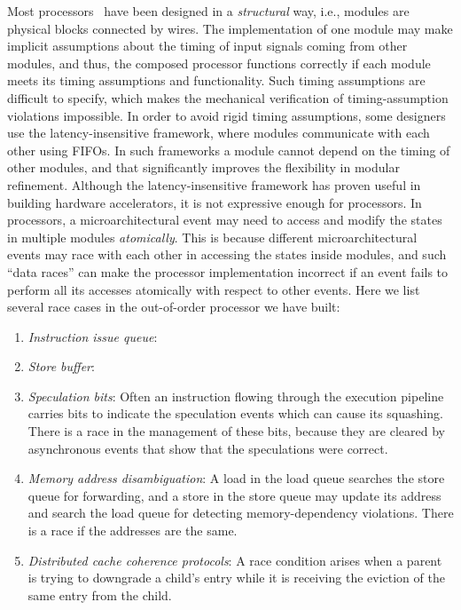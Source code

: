 \documentclass[conference]{IEEEtran}
\begin{document}
Most processors~\cite{rocketchip,boom,fabscalar,pulp} have been designed in a \emph{structural} way, i.e., modules are physical blocks connected by wires.
The implementation of one module may make implicit assumptions about the timing of input signals coming from other modules, and thus, the composed processor functions correctly if each module meets its timing assumptions and functionality.
Such timing assumptions are difficult to specify, which makes the mechanical verification of timing-assumption violations impossible.
In order to avoid rigid timing assumptions, some designers use the latency-insensitive framework, where modules communicate with each other using FIFOs.
In such frameworks a module cannot depend on the timing of other modules, and that significantly improves the flexibility in modular refinement.
Although the latency-insensitive framework has proven useful in building hardware accelerators, it is not expressive enough for processors. 
In processors, a microarchitectural event may need to access and modify the states in multiple modules \emph{atomically}. 
This is because different microarchitectural events may race with each other in accessing the states inside modules, and such ``data races'' can make the processor implementation incorrect if an event fails to perform all its accesses atomically with respect to other events.
Here we list several race cases in the out-of-order processor we have built:
\begin{enumerate}
    \item \emph{Instruction issue queue}:
    
    \item \emph{Store buffer}:
    
    \item \emph{Speculation bits}:
    Often an instruction flowing through the execution pipeline carries bits to indicate the speculation events which can cause its squashing.
    There is a race in the management of these bits, because they are cleared by asynchronous events that show that the speculations were correct.
    
    \item \emph{Memory address disambiguation}:
    A load in the load queue searches the store queue for forwarding, and a store in the store queue may update its address and search the load queue for detecting memory-dependency violations. 
    There is a race if the addresses are the same.
    
    \item \emph{Distributed cache coherence protocols}:
    A race condition arises when a parent is trying to downgrade a child's entry while it is receiving the eviction of the same entry from the child.
\end{enumerate}
\end{document}
